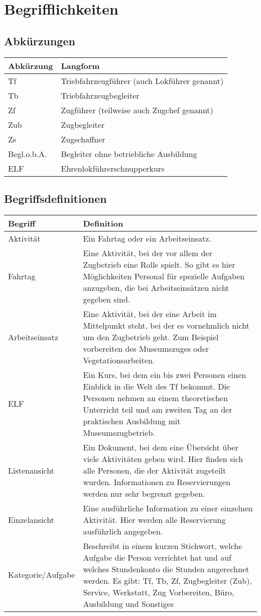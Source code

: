 \chapter{Begrifflichkeiten}
\section{Abkürzungen}\label{abkuerzungen}
\begin{tabularx}{\textwidth}{l|X}
  Abkürzung & Langform \\
  \hline
  \hline
  Tf & Triebfahrzeugführer (auch Lokführer genannt)\\
  \hline
  Tb & Triebfahrzeugbegleiter \\
  \hline
  Zf & Zugführer (teilweise auch Zugchef genannt)\\
  \hline
  Zub	& Zugbegleiter \\
  \hline
  Zs & Zugschaffner \\
  \hline
  Begl.o.b.A. & Begleiter ohne betriebliche Ausbildung \\
  \hline
  ELF &	Ehrenlokführerschnupperkurs \\
\end{tabularx}


\section{Begriffsdefinitionen}\label{glossar}
\begin{tabularx}{\textwidth}{l|X}
  Begriff	& Definition \\
  \hline
  \hline
  Aktivität &
    Ein Fahrtag oder ein Arbeitseinsatz. \\
  \hline
  Fahrtag	&
    Eine Aktivität, bei der vor allem der Zugbetrieb eine Rolle spielt.
    So gibt es hier Möglichkeiten Personal für spezielle Aufgaben anzugeben, die bei Arbeitseinsätzen nicht gegeben sind.\\
  \hline
  Arbeitseinsatz &
    Eine Aktivität, bei der eine Arbeit im Mittelpunkt steht, bei der es vornehmlich nicht um den Zugbetrieb geht.
    Zum Beispiel vorbereiten des Museumszuges oder Vegetationsarbeiten. \\
  \hline
  ELF &
    Ein Kurs, bei dem ein bis zwei Personen einen Einblick in die Welt des Tf bekommt.
    Die Personen nehmen an einem theoretischen Unterricht teil und am zweiten Tag an der praktischen Ausbildung mit Museumszugbetrieb.\\
  \hline
  Listenansicht &
    Ein Dokument, bei dem eine Übersicht über viele Aktivitäten geben wird.
    Hier finden sich alle Personen, die der Aktivität zugeteilt wurden.
    Informationen zu Reservierungen werden nur sehr begrenzt gegeben. \\
  \hline
  Einzelansicht &
  	Eine ausführliche Information zu einer einzelnen Aktivität.
    Hier werden alle Reservierung ausführlich angegeben. \\
  \hline
  Kategorie/Aufgabe &
  	Beschreibt in einem kurzen Stichwort, welche Aufgabe die Person verrichtet hat und auf welches Stundenkonto die Stunden angerechnet werden. \newline
    Es gibt: Tf, Tb, Zf, Zugbegleiter (Zub), Service, Werkstatt, Zug Vorbereiten, Büro, Ausbildung und Sonstiges
\end{tabularx}
